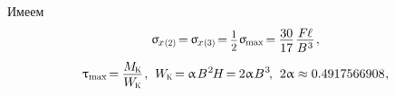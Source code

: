 \documentclass[14pt]{extarticle}
\begin{document}
Имеем
\nopagebreak\vspace{-1em}\[\begin{gathered}
\upsigma_{\hspace{-0.15ex}\scalebox{.8}{$x$}\hspace{.1ex}\scalebox{.7}{(2)}} \hspace{-.33ex}
= \hspace{-.2ex}
\upsigma_{\hspace{-0.15ex}\scalebox{.8}{$x$}\hspace{.1ex}\scalebox{.7}{(3)}} \hspace{-.33ex}
= \hspace{-.2ex}
\scalebox{.88}{$ \displaystyle\frac{\raisebox{-0.18em}{$1$}}{2} $} \hspace{.15ex} \upsigma_{\hspace{-0.2ex}\scalebox{.75}{max}} \hspace{-.3ex}
= \hspace{-.1ex} \displaystyle\frac{\raisebox{-0.18em}{$30$}}{17} \hspace{.2ex} \displaystyle\frac{\raisebox{-0.18em}{$F \hspace{-0.1ex} \ell$}}{B^{\hspace{.1ex}3}}
\hspace{.2ex} ,
\\[.4em]
%
\uptau_{\scalebox{.75}{max}} \hspace{-.3ex}
= \hspace{-.1ex} \displaystyle\frac{\raisebox{-0.1em}{$M_{\hspace{-0.1ex}\mathrm{\scalebox{.6}{K}}}$}}{W_{\hspace{-0.1ex}\mathrm{\scalebox{.6}{K}}}}
\hspace{.2ex} , \hspace{.4em}
W_{\hspace{-0.1ex}\mathrm{\scalebox{.6}{K}}} \hspace{-0.3ex}=\hspace{-0.1ex}
\upalpha \hspace{.2ex} B^{\hspace{.1ex}2} \hspace{-0.2ex} H \hspace{-0.3ex}=\hspace{-0.1ex} 2 \upalpha \hspace{.1ex} B^{\hspace{.1ex}3} \hspace{-.3ex}
, \hspace{.4em}
2 \upalpha \approx 0.4917566908 \hspace{.1ex} ,

\end{gathered}\]
\end{document}
